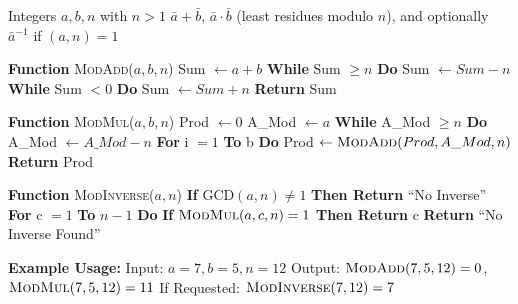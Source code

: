\begin{problems}
\begin{sol}
        
    \begin{breakablealgorithm}
        \begin{algorithmic}[1]
            \Require Integers $a, b, n$ with $n > 1$
            \Ensure $\bar a + \bar b$, $\bar a \cdot \bar b$ (least residues modulo $n$), and optionally $\bar a^{-1}$ if $(a,n) = 1$

            \State \textbf{Function} \textsc{ModAdd}($a,b,n$)
            \State Sum $\gets a + b$
            \State \textbf{While} Sum $\ge n$ \textbf{Do}
                \State Sum $\gets Sum - n$
            \State \textbf{While} Sum $< 0$ \textbf{Do}
                \State Sum $\gets Sum + n$
            \State \textbf{Return} Sum

            \State \textbf{Function} \textsc{ModMul}($a,b,n$)
            \State Prod $\gets 0$
            \State A\_Mod $\gets a$
            \State \textbf{While} A\_Mod $\ge n$ \textbf{Do}
                \State A\_Mod $\gets A\_Mod - n$
            \State \textbf{For} i $= 1$ \textbf{To} b \textbf{Do}
                \State Prod $\gets \textsc{ModAdd}(Prod, A\_Mod, n)$
            \State \textbf{Return} Prod

            \State \textbf{Function} \textsc{ModInverse}($a,n$)
            \State \textbf{If} GCD$(a,n) \neq 1$ \textbf{Then Return} ``No Inverse''
            \State \textbf{For} c $= 1$ \textbf{To} $n-1$ \textbf{Do}
                \State \textbf{If} $\textsc{ModMul}(a,c,n) = 1$ \textbf{Then Return} c
            \State \textbf{Return} ``No Inverse Found''

            \State \textbf{Example Usage:}
            \State Input: $a=7, b=5, n=12$
            \State Output: $\textsc{ModAdd}(7,5,12) = 0$, $\textsc{ModMul}(7,5,12) = 11$
            \State If Requested: $\textsc{ModInverse}(7,12) = 7$
        \end{algorithmic}
    \end{breakablealgorithm}
    \end{sol}
\end{problems}